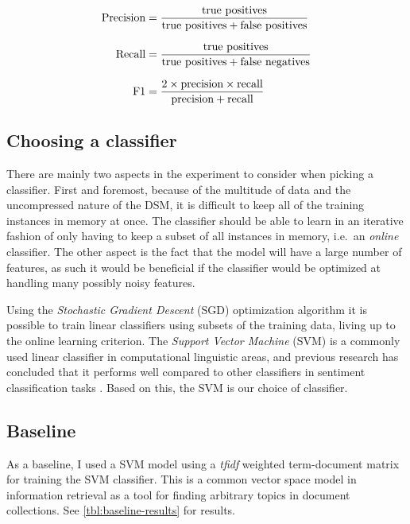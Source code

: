 \begin{equation} \label{eq:precision-recall}
\begin{spreadlines}{10pt}
\begin{aligned}
\text{Precision} &= \frac{\text{true positives}}{\text{true positives} + \text{false positives}}
\\
\text{Recall} &= \frac{\text{true positives}}{\text{true positives} + \text{false negatives}}
\\
\text{F1} &= \frac{2 \times \text{precision} \times \text{recall}}{\text{precision} + \text{recall}}
\end{aligned}
\end{spreadlines}
\end{equation}

\subsection{Choosing a classifier}\label{method-choosing-a-classifier}

There are mainly two aspects in the experiment to consider when picking a classifier. First and foremost, because of the multitude of data and the uncompressed nature of the DSM, it is difficult to keep all of the training instances in memory at once. The classifier should be able to learn in an iterative fashion of only having to keep a subset of all instances in memory, i.e.~an \emph{online} classifier. The other aspect is the fact that the model will have a large number of features, as such it would be beneficial if the classifier would be optimized at handling many possibly noisy features.

Using the \emph{Stochastic Gradient Descent} (SGD) optimization algorithm it is possible to train linear classifiers using subsets of the training data, living up to the online learning criterion. The \emph{Support Vector Machine} (SVM) is a commonly used linear classifier in computational linguistic areas, and previous research has concluded that it performs well compared to other classifiers in sentiment classification tasks \cite{Yao2011Sentiment}. Based on this, the SVM is our choice of classifier.

\subsection{Baseline}\label{method-baseline}

As a baseline, I used a SVM model using a \emph{tfidf} weighted term-document matrix for training the SVM classifier. This is a common vector space model in information retrieval as a tool for finding arbitrary topics in document collections. See \cref{tbl:baseline-results} for results.

